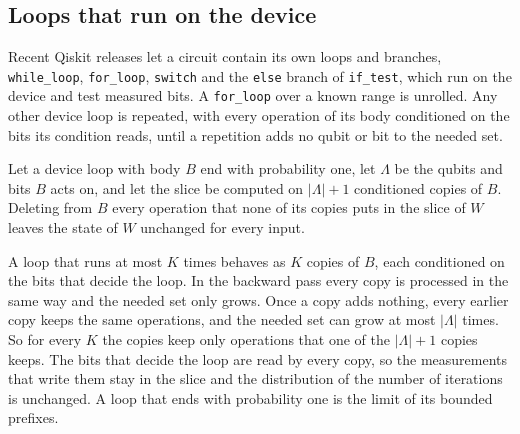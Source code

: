 \subsection{Loops that run on the device}\label{sec:b-loops}
Recent Qiskit releases let a circuit contain its own loops and branches, \texttt{while\_loop}, \texttt{for\_loop},
\texttt{switch} and the \texttt{else} branch of \texttt{if\_test}, which run on the device and test measured bits. A
\texttt{for\_loop} over a known range is unrolled. Any other device loop is repeated, with every operation of its body
conditioned on the bits its condition reads, until a repetition adds no qubit or bit to the needed set.

\begin{proposition}\label{prop:b-loops}
Let a device loop with body $B$ end with probability one, let $\Lambda$ be the qubits and bits $B$ acts on, and let the
slice be computed on $|\Lambda| + 1$ conditioned copies of $B$. Deleting from $B$ every operation that none of its copies
puts in the slice of $W$ leaves the state of $W$ unchanged for every input.
\end{proposition}

\begin{IEEEproof}
A loop that runs at most $K$ times behaves as $K$ copies of $B$, each conditioned on the bits that decide the loop. In
the backward pass every copy is processed in the same way and the needed set only grows. Once a copy adds nothing, every
earlier copy keeps the same operations, and the needed set can grow at most $|\Lambda|$ times. So for every $K$ the copies
keep only operations that one of the $|\Lambda| + 1$ copies keeps. The bits that decide the loop are read by every copy,
so the measurements that write them stay in the slice and the distribution of the number of iterations is unchanged. A
loop that ends with probability one is the limit of its bounded prefixes.
\end{IEEEproof}

